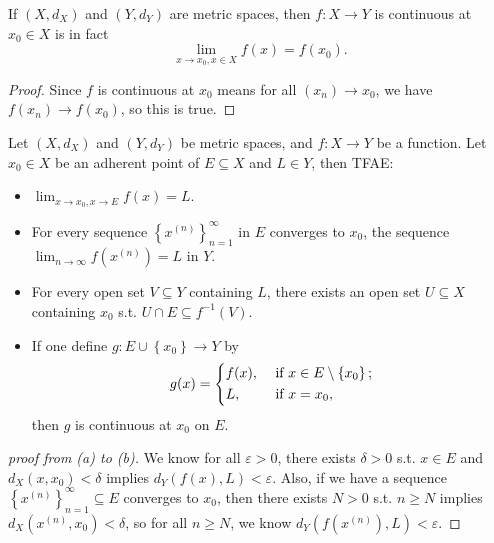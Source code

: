 \begin{lemma}
    If \((X, d_X)\) and \((Y, d_Y)\) are metric spaces, then \(f:X \to Y\) is continuous at \(x_0 \in X\) is in fact 
    \[
        \lim_{x \to x_0, x \in X} f(x) = f(x_0).
    \]     
\end{lemma}
\begin{proof}
    Since \(f\) is continuous at \(x_0\) means for all \(\left( x_n \right) \to x_0 \), we have \(f(x_n) \to  f(x_0)\), so this is true.   
\end{proof}

\begin{proposition} \label{prop: converge in E TFAE}
    Let \((X, d_X)\) and \((Y, d_Y)\) be metric spaces, and \(f: X \to  Y\) be a function. Let \(x_0 \in X\) be an adherent point of \(E \subseteq X\) and \(L \in Y\), then TFAE:
    \begin{itemize}
        \item [(a)] \(\lim_{x \to x_0, x \to E} f(x) = L \). 
        \item [(b)] For every sequence \(\left\{ x^{(n)} \right\}_{n=1}^{\infty}  \) in \(E\) converges to \(x_0\), the sequence \(\lim_{n \to \infty} f \left( x^{(n)} \right) = L  \) in \(Y\). 
        \item [(c)] For every open set \(V \subseteq Y\) containing \(L\), there exists an open set \(U \subseteq X\) containing \(x_0\) s.t. \(U \cap E \subseteq f^{-1}(V)\). 
        \item [(d)] If one define \(g: E \cup \left\{ x_0 \right\} \to  Y \) by 
        \[
            g(x) = \begin{dcases}
                f(x), &\text{ if } x \in E \setminus \left\{ x_0 \right\} ;\\
                L, &\text{ if } x = x_0, 
            \end{dcases}
        \] then \(g\) is continuous at \(x_0\) on \(E\).           
    \end{itemize}      
\end{proposition}
\begin{proof}[proof from (a) to (b)]
    We know for all \(\varepsilon > 0\), there exists \(\delta > 0\) s.t. \(x \in E\) and \(d_X(x, x_0) < \delta \) implies \(d_Y (f(x), L) < \varepsilon \). Also, if we have a sequence \(\left\{ x^{(n)} \right\}_{n=1}^{\infty} \subseteq E \) converges to \(x_0\), then there exists \(N > 0\) s.t. \(n \ge N\) implies \(d_X \left( x^{(n)}, x_0 \right) < \delta \), so for all \(n \ge N\), we know \(d_Y \left( f \left( x^{(n)}\right), L  \right) < \varepsilon  \).           
\end{proof}
